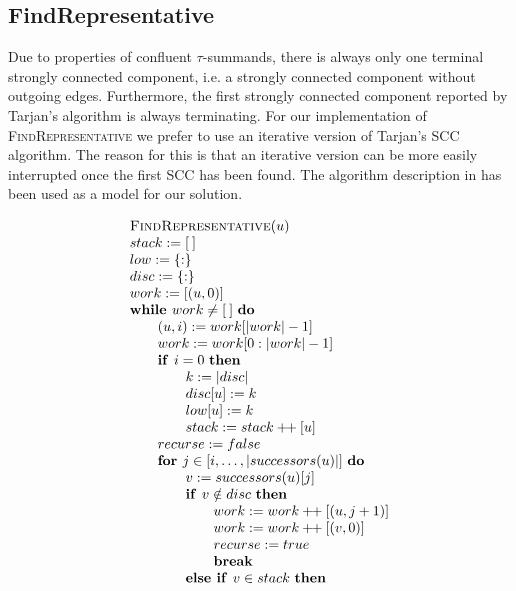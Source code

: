 \documentclass{article}
\newcommand{\concat}{\ensuremath{+\!\!+\:}}
\newcommand{\emptymap}{\ensuremath{\{ : \}}}
\newcommand{\emptylist}{\ensuremath{[\:]}}
\newcommand{\Space}{\text{\ }}
\newcommand{\If}{\text{\textbf{if }}}
\newcommand{\Do}{\text{\textbf{do }}}
\newcommand{\Then}{\text{\textbf{then }}}
\newcommand{\Else}{\text{\textbf{else }}}
\newcommand{\For}{\text{\textbf{for }}}
\newcommand{\While}{\text{\textbf{while }}}
\newcommand{\Break}{\text{\textbf{break }}}
\begin{document}
\subsection{FindRepresentative}
Due to properties of confluent $\tau$-summands, there is always only one terminal strongly connected component, i.e. a strongly connected component without outgoing edges. Furthermore, the first strongly connected component reported by Tarjan's algorithm is always terminating. For our implementation of \textsc{FindRepresentative} we prefer to use an iterative version of Tarjan's SCC algorithm. The reason for this is that an iterative version can be more easily interrupted once the first SCC has been found. The algorithm description in \cite{TarjanIterative} has been used as a model for our solution.

\[
\begin{tabular}{l}
\textsc{FindRepresentative}$(u)$ \\
$stack := \emptylist$ \\
$low := \emptymap$ \\
$disc := \emptymap$ \\
$work := [(u, 0)]$ \\
$\While work \neq \emptylist \Space \Do$ \\
\qquad $(u, i) := work[|work| - 1]$ \\
\qquad $work := work[0 : |work| - 1]$ \\
\qquad $\If i = 0 \Space \Then$ \\
\qquad \qquad $k := |disc|$ \\
\qquad \qquad $disc[u] := k$ \\
\qquad \qquad $low[u] := k$ \\
\qquad \qquad $stack := stack \concat [u]$ \\
\qquad $recurse := false$ \\
\qquad $\For j \in [i, \ldots, |successors(u)|]$ \Do \\
\qquad \qquad $v := successors(u)[j]$ \\
\qquad \qquad $\If v \notin disc$ \Then \\
\qquad \qquad \qquad $work := work \concat [(u, j+1)]$ \\
\qquad \qquad \qquad $work := work \concat [(v, 0)]$ \\
\qquad \qquad \qquad $recurse := true$ \\
\qquad \qquad \qquad \Break \\
\qquad \qquad \Else \If $v \in stack$ \Then \\

\end{tabular}\]
\end{document}
